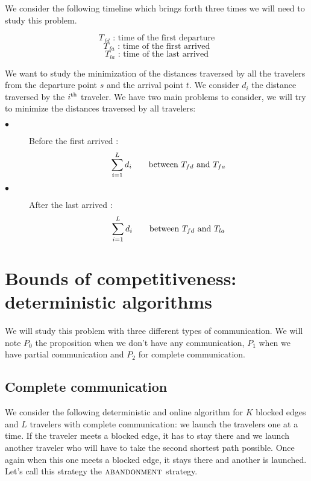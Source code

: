 \documentclass[letter-size, 11pt]{article}
\newcommand{\ith}[1]{#1^{\mbox{\scriptsize{th}}}}
\begin{document}
We consider the following timeline which brings forth three times we will need to study this problem.
\begin{center}
\end{center}
\[
T_{fd} \mbox{\ : time of the first departure}
\]
\[
T_{fa} \mbox{\ : time of the first arrived}
\]
\[
T_{la} \mbox{\ : time of the last arrived}
\]

We want to study the minimization of the distances traversed by all the travelers from the departure point $s$ and the arrival point $t$. We consider $d_i$ the distance traversed by the $\ith{i}$ traveler. We have two main problems to consider, we will try to minimize the distances traversed by all travelers:
\begin{description}
\item[$\bullet$] Before the first arrived :
\[ 
\sum_{i=1}^{L} d_{i} \mbox{\qquad between } T_{fd} \mbox{\ and } T_{fa}
\]
\item[$\bullet$] After the last arrived :
\[ 
\sum_{i=1}^{L} d_{i} \mbox{\qquad between } T_{fd} \mbox{\ and } T_{la}
\]
\end{description}



\section{Bounds of competitiveness: deterministic algorithms}

We will study this problem with three different types of communication. We will note $P_0$ the proposition when we don't have any communication, $P_1$ when we have partial communication and $P_2$ for complete communication.

\subsection{Complete communication}

We consider the following deterministic and online algorithm for $K$ blocked edges and $L$ travelers with complete communication: we launch the travelers one at a time. If the traveler meets a blocked edge, it has to stay there and we launch another traveler who will have to take the second shortest path possible. Once again when this one meets a blocked edge, it stays there and another is launched. Let's call this strategy the $\textsc{abandonment}$ strategy.
\end{document}
